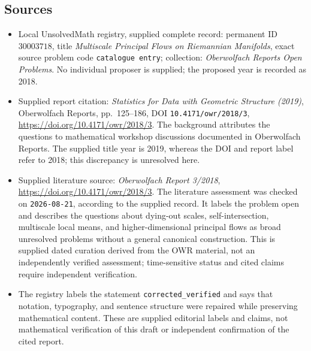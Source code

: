 \documentclass[11pt]{article}
\begin{document}
\subsection{Sources}
\begin{itemize}
\item Local UnsolvedMath registry, supplied complete record: permanent ID \(30003718\), title \emph{Multiscale Principal Flows on Riemannian Manifolds}, exact source problem code \texttt{catalogue entry}; collection: \emph{Oberwolfach Reports Open Problems}. No individual proposer is supplied; the proposed year is recorded as 2018.
\item Supplied report citation: \emph{Statistics for Data with Geometric Structure (2019)}, Oberwolfach Reports, pp.\ 125--186, DOI \texttt{10.4171/owr/2018/3}, \url{https://doi.org/10.4171/owr/2018/3}. The background attributes the questions to mathematical workshop discussions documented in Oberwolfach Reports. The supplied title year is 2019, whereas the DOI and report label refer to 2018; this discrepancy is unresolved here.
\item Supplied literature source: \emph{Oberwolfach Report 3/2018}, \url{https://doi.org/10.4171/owr/2018/3}. The literature assessment was checked on \texttt{2026-08-21}, according to the supplied record. It labels the problem open and describes the questions about dying-out scales, self-intersection, multiscale local means, and higher-dimensional principal flows as broad unresolved problems without a general canonical construction. This is supplied dated curation derived from the OWR material, not an independently verified assessment; time-sensitive status and cited claims require independent verification.
\item The registry labels the statement \texttt{corrected\_verified} and says that notation, typography, and sentence structure were repaired while preserving mathematical content. These are supplied editorial labels and claims, not mathematical verification of this draft or independent confirmation of the cited report.
\end{itemize}
\end{document}
